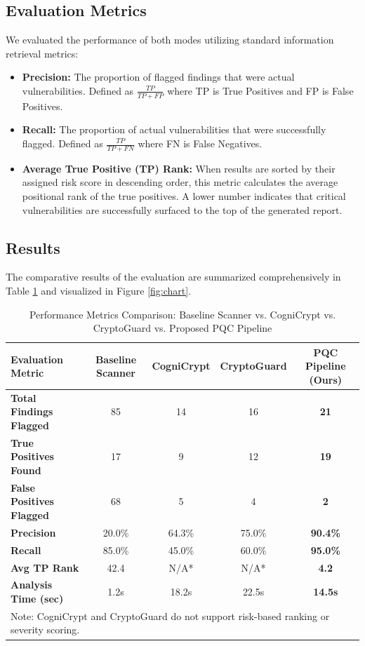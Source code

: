 \documentclass[conference]{IEEEtran}
\begin{document}
\subsection{Evaluation Metrics}
We evaluated the performance of both modes utilizing standard information retrieval metrics:
\begin{itemize}
    \item \textbf{Precision:} The proportion of flagged findings that were actual vulnerabilities. Defined as $\frac{TP}{TP + FP}$ where TP is True Positives and FP is False Positives.
    \item \textbf{Recall:} The proportion of actual vulnerabilities that were successfully flagged. Defined as $\frac{TP}{TP + FN}$ where FN is False Negatives.
    \item \textbf{Average True Positive (TP) Rank:} When results are sorted by their assigned risk score in descending order, this metric calculates the average positional rank of the true positives. A lower number indicates that critical vulnerabilities are successfully surfaced to the top of the generated report.
\end{itemize}

\subsection{Results}

The comparative results of the evaluation are summarized comprehensively in Table \ref{tab:results} and visualized in Figure \ref{fig:chart}.

\begin{table}[t]
\caption{Performance Metrics Comparison: Baseline Scanner vs. CogniCrypt vs. CryptoGuard vs. Proposed PQC Pipeline}
\begin{center}
\renewcommand{\arraystretch}{1.3}
\begin{tabular}{|l|c|c|c|c|}
\hline
\textbf{Evaluation Metric} & \textbf{Baseline Scanner} & \textbf{CogniCrypt \cite{kruger2017}} & \textbf{CryptoGuard \cite{rahaman2019}} & \textbf{PQC Pipeline (Ours)} \\
\hline
\hline
\textbf{Total Findings Flagged} & 85 & 14 & 16 & \textbf{21} \\
\hline
\textbf{True Positives Found} & 17 & 9 & 12 & \textbf{19} \\
\hline
\textbf{False Positives Flagged} & 68 & 5 & 4 & \textbf{2} \\
\hline
\textbf{Precision} & 20.0\% & 64.3\% & 75.0\% & \textbf{90.4\%} \\
\hline
\textbf{Recall} & 85.0\% & 45.0\% & 60.0\% & \textbf{95.0\%} \\
\hline
\textbf{Avg TP Rank} & 42.4 & N/A* & N/A* & \textbf{4.2} \\
\hline
\textbf{Analysis Time (sec)} & 1.2s & 18.2s & 22.5s & \textbf{14.5s} \\
\hline
\multicolumn{5}{l}{\small *Note: CogniCrypt and CryptoGuard do not support risk-based ranking or severity scoring.}\\
\end{tabular}
\label{tab:results}
\nobreak
\end{center}
\end{table}
\end{document}

